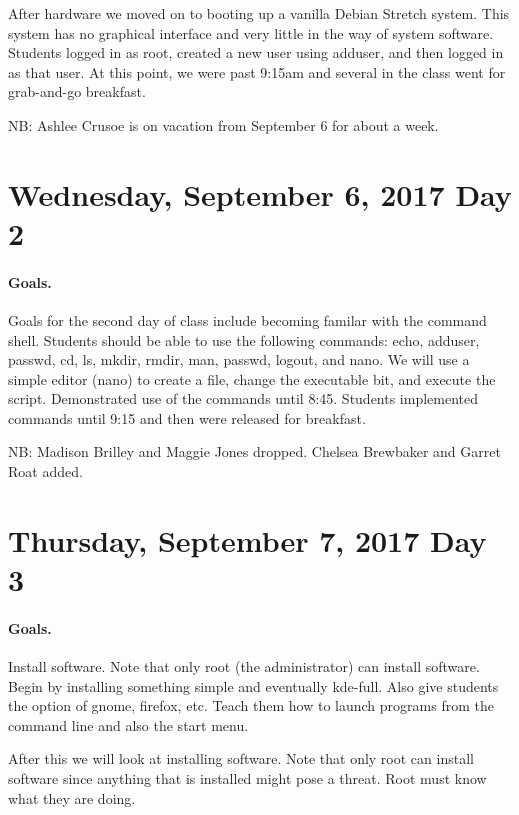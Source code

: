 \documentclass[letterpaper,10pt]{memoir}
\begin{document}
	After hardware we moved on to booting up a vanilla Debian Stretch system. This system has no graphical interface and very little in the way of system software. Students logged in as root, created a new user using adduser, and then logged in as that user. At this point, we were past 9:15am  and several in the class went for grab-and-go breakfast.

	NB: Ashlee Crusoe is on vacation from September 6 for about a week.


\section*{Wednesday, September 6, 2017 \hfill Day 2}

	\paragraph*{Goals.}Goals for the second day of class include becoming familar with the command shell. Students should be able to use the following commands: echo, adduser, passwd, cd, ls, mkdir, rmdir, man, passwd, logout, and nano. We will use a simple editor (nano) to create a file, change the executable bit, and execute the script. Demonstrated use of the commands until 8:45. Students implemented commands until 9:15 and then were released for breakfast.

	NB: Madison Brilley and Maggie Jones dropped. Chelsea Brewbaker and Garret Roat added.


\section*{Thursday, September 7, 2017 \hfill Day 3}

	\paragraph{Goals.}Install software. Note that only root (the administrator) can install software. Begin by installing something simple and eventually kde-full. Also give students the option of gnome, firefox, etc. Teach them how to launch programs from the command line and also the start menu.





	After this we will look at installing software. Note that only root can install software since anything that is installed might pose a threat. Root must know what they are doing.
\end{document}
